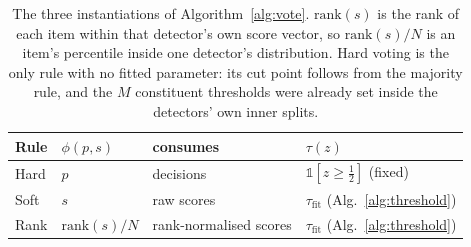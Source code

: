 \begin{table}[t]
  \centering
  \caption{The three instantiations of Algorithm~\ref{alg:vote}. $\mathrm{rank}(s)$ is
  the rank of each item within that detector's own score vector, so $\mathrm{rank}(s)/N$
  is an item's percentile inside one detector's distribution. Hard voting is the only
  rule with no fitted parameter: its cut point follows from the majority rule, and the
  $M$ constituent thresholds were already set inside the detectors' own inner splits.}
  \label{tab:vote_instantiations}
  \footnotesize
  \begin{tabular}{l l l l}
    \hline
    Rule & $\phi(p, s)$ & consumes & $\tau(z)$ \\
    \hline
    Hard & $p$ & decisions & $\mathbb{1}[z \ge \tfrac{1}{2}]$ \quad (fixed) \\
    Soft & $s$ & raw scores & $\tau_{\mathrm{fit}}$ (Alg.~\ref{alg:threshold}) \\
    Rank & $\mathrm{rank}(s)/N$ & rank-normalised scores
         & $\tau_{\mathrm{fit}}$ (Alg.~\ref{alg:threshold}) \\
    \hline
  \end{tabular}
\end{table}
